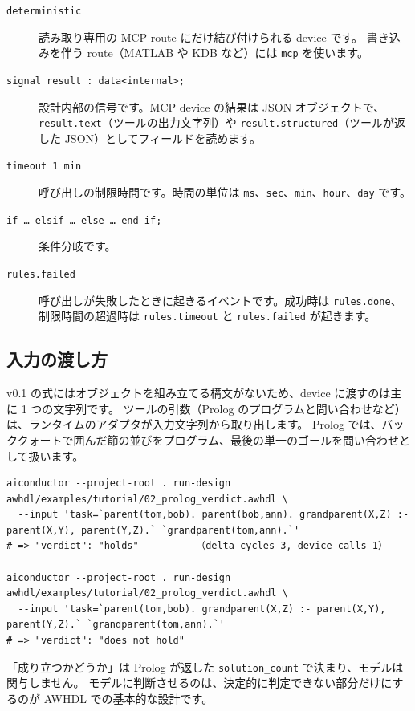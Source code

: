 \documentclass[a4paper,11pt]{ltjsarticle}
\begin{document}
\begin{description}
  \item[\texttt{deterministic}] 読み取り専用の MCP route にだけ結び付けられる device です。
    書き込みを伴う route（MATLAB や KDB など）には \texttt{mcp} を使います。
  \item[\texttt{signal result : data<internal>;}] 設計内部の信号です。MCP device の結果は
    JSON オブジェクトで、\texttt{result.text}（ツールの出力文字列）や
    \texttt{result.structured}（ツールが返した JSON）としてフィールドを読めます。
  \item[\texttt{timeout 1 min}] 呼び出しの制限時間です。時間の単位は
    \texttt{ms}、\texttt{sec}、\texttt{min}、\texttt{hour}、\texttt{day} です。
  \item[\texttt{if \dots\ elsif \dots\ else \dots\ end if;}] 条件分岐です。
  \item[\texttt{rules.failed}] 呼び出しが失敗したときに起きるイベントです。成功時は
    \texttt{rules.done}、制限時間の超過時は \texttt{rules.timeout} と \texttt{rules.failed} が起きます。
\end{description}

\subsection{入力の渡し方}

v0.1 の式にはオブジェクトを組み立てる構文がないため、device に渡すのは主に 1 つの文字列です。
ツールの引数（Prolog のプログラムと問い合わせなど）は、ランタイムのアダプタが入力文字列から取り出します。
Prolog では、バッククォートで囲んだ節の並びをプログラム、最後の単一のゴールを問い合わせとして扱います。

\begin{lstlisting}[style=shell]
aiconductor --project-root . run-design awhdl/examples/tutorial/02_prolog_verdict.awhdl \
  --input 'task=`parent(tom,bob). parent(bob,ann). grandparent(X,Z) :- parent(X,Y), parent(Y,Z).` `grandparent(tom,ann).`'
# => "verdict": "holds"          （delta_cycles 3, device_calls 1）

aiconductor --project-root . run-design awhdl/examples/tutorial/02_prolog_verdict.awhdl \
  --input 'task=`parent(tom,bob). grandparent(X,Z) :- parent(X,Y), parent(Y,Z).` `grandparent(tom,ann).`'
# => "verdict": "does not hold"
\end{lstlisting}

\begin{point}[ポイント]
「成り立つかどうか」は Prolog が返した \texttt{solution\_count} で決まり、モデルは関与しません。
モデルに判断させるのは、決定的に判定できない部分だけにするのが AWHDL での基本的な設計です。
\end{point}
\end{document}
